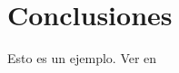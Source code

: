 \chapter{Conclusiones}
\label{cap:conclusiones}

Esto es un ejemplo. Ver en  \cite{darwin2009origen} \cite{del1984luces}